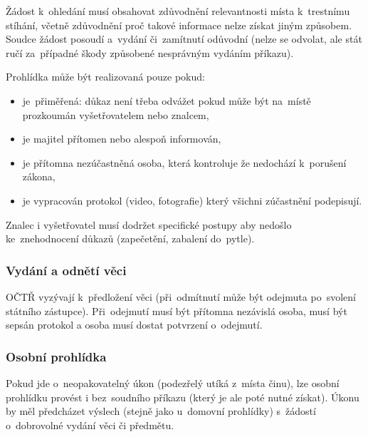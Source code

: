 Žádost k~ohledání musí obsahovat zdůvodnění relevantnosti místa k~trestnímu stíhání, včetně zdůvodnění proč takové informace nelze získat jiným způsobem.
Soudce žádost posoudí a~vydání či~zamítnutí odůvodní (nelze se odvolat, ale stát ručí za~případné škody způsobené nesprávným vydáním příkazu).

Prohlídka může být realizovaná pouze pokud:
\vspace*{-1em}\begin{itemize}
\item je~přiměřená: důkaz není třeba odvážet pokud může být na~místě prozkoumán vyšetřovatelem nebo znalcem,
\item je majitel přítomen nebo alespoň informován,
\item je přítomna nezúčastněná osoba, která kontroluje že nedochází k~porušení zákona,
\item je vypracován protokol (video, fotografie) který všichni zúčastnění podepisují.
\end{itemize}

Znalec i vyšetřovatel musí dodržet specifické postupy aby nedošlo ke~znehodnocení důkazů (zapečetění, zabalení do~pytle).

\subsubsection{Vydání a odnětí věci}

OČTŘ vyzývají k~předložení věci (při~odmítnutí může být odejmuta po~svolení státního zástupce).
Při~odejmutí musí být přítomna nezávislá osoba, musí být sepsán protokol a osoba musí dostat potvrzení o~odejmutí.


\subsubsection{Osobní prohlídka}

Pokud jde o~neopakovatelný úkon (podezřelý utíká z~místa činu), lze osobní prohlídku provést i bez~soudního příkazu (který je ale poté nutné získat).
Úkonu by měl předcházet výslech (stejně jako u~domovní prohlídky) s~žádostí o~dobrovolné vydání věci či předmětu.


